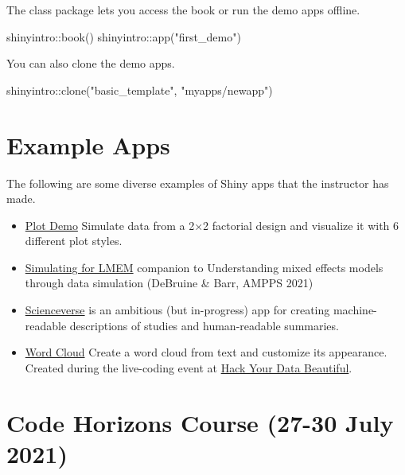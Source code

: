 \documentclass[
]{book}
\newenvironment{Shaded}{\begin{snugshade}}{\end{snugshade}}
\newcommand{\FunctionTok}[1]{\textcolor[rgb]{0.00,0.00,0.00}{#1}}
\newcommand{\NormalTok}[1]{#1}
\newcommand{\SpecialCharTok}[1]{\textcolor[rgb]{0.00,0.00,0.00}{#1}}
\newcommand{\StringTok}[1]{\textcolor[rgb]{0.31,0.60,0.02}{#1}}
\providecommand{\tightlist}{%
  \setlength{\itemsep}{0pt}\setlength{\parskip}{0pt}}
\begin{document}
The class package lets you access the book or run the demo apps offline.

\begin{Shaded}
\begin{Highlighting}[]
\NormalTok{shinyintro}\SpecialCharTok{::}\FunctionTok{book}\NormalTok{()}
\NormalTok{shinyintro}\SpecialCharTok{::}\FunctionTok{app}\NormalTok{(}\StringTok{"first\_demo"}\NormalTok{)}
\end{Highlighting}
\end{Shaded}

You can also clone the demo apps.

\begin{Shaded}
\begin{Highlighting}[]
\NormalTok{shinyintro}\SpecialCharTok{::}\FunctionTok{clone}\NormalTok{(}\StringTok{"basic\_template"}\NormalTok{, }\StringTok{"myapps/newapp"}\NormalTok{)}
\end{Highlighting}
\end{Shaded}

\hypertarget{example-apps}{%
\section{Example Apps}\label{example-apps}}

The following are some diverse examples of Shiny apps that the instructor has made.

\begin{itemize}
\tightlist
\item
  \href{https://shiny.psy.gla.ac.uk/debruine/plotdemo/}{Plot Demo} Simulate data from a 2×2 factorial design and visualize it with 6 different plot styles.
\item
  \href{https://shiny.psy.gla.ac.uk/lmem_sim/}{Simulating for LMEM} companion to Understanding mixed effects models through data simulation (DeBruine \& Barr, AMPPS 2021)
\item
  \href{http://shiny.ieis.tue.nl/scienceverse/}{Scienceverse} is an ambitious (but in-progress) app for creating machine-readable descriptions of studies and human-readable summaries.
\item
  \href{https://shiny.psy.gla.ac.uk/debruine/wordcloud/}{Word Cloud} Create a word cloud from text and customize its appearance. Created during the live-coding event at \href{https://psyteachr.github.io/hack-your-data/}{Hack Your Data Beautiful}.
\end{itemize}

\hypertarget{code-horizons-course-27-30-july-2021}{%
\section{Code Horizons Course (27-30 July 2021)}\label{code-horizons-course-27-30-july-2021}}
\end{document}
